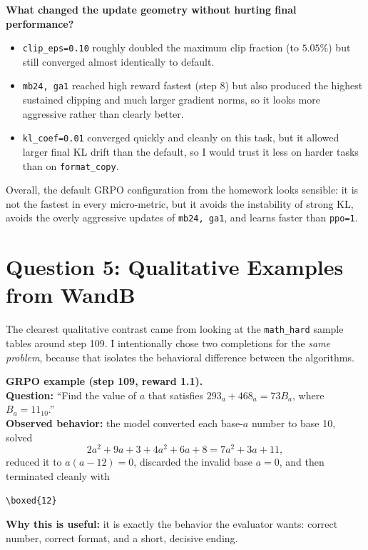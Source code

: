 \documentclass[11pt]{article}
\begin{document}
\textbf{What changed the update geometry without hurting final performance?}
\begin{itemize}[leftmargin=1.4em]
\item \texttt{clip\_eps=0.10} roughly doubled the maximum clip fraction (to \(5.05\%\)) but still converged almost identically to default.
\item \texttt{mb24, ga1} reached high reward fastest (step 8) but also produced the highest sustained clipping and much larger gradient norms, so it looks more aggressive rather than clearly better.
\item \texttt{kl\_coef=0.01} converged quickly and cleanly on this task, but it allowed larger final KL drift than the default, so I would trust it less on harder tasks than on \texttt{format\_copy}.
\end{itemize}

Overall, the default GRPO configuration from the homework looks sensible: it is not the fastest in every micro-metric, but it avoids the instability of strong KL, avoids the overly aggressive updates of \texttt{mb24, ga1}, and learns faster than \texttt{ppo=1}.

\section{Question 5: Qualitative Examples from WandB}
The clearest qualitative contrast came from looking at the \texttt{math\_hard} sample tables around step 109. I intentionally chose two completions for the \emph{same problem}, because that isolates the behavioral difference between the algorithms.

\begin{examplebox}
\textbf{GRPO example (step 109, reward 1.1).} \\
\textbf{Question:} ``Find the value of \(a\) that satisfies \(293_a + 468_a = 73B_a\), where \(B_a = 11_{10}\).'' \\
\textbf{Observed behavior:} the model converted each base-\(a\) number to base 10, solved
\[
2a^2 + 9a + 3 + 4a^2 + 6a + 8 = 7a^2 + 3a + 11,
\]
reduced it to \(a(a-12)=0\), discarded the invalid base \(a=0\), and then terminated cleanly with \\
\centerline{\texttt{\textbackslash boxed\{12\}}}
\textbf{Why this is useful:} it is exactly the behavior the evaluator wants: correct number, correct format, and a short, decisive ending.
\end{examplebox}
\end{document}
